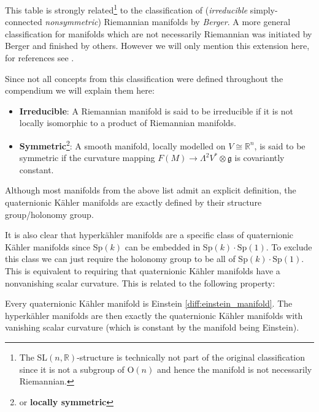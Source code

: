 	\begin{remark*}
		This table is strongly related\footnote{The SL$(n, \mathbb{R})$-structure is technically not part of the original classification since it is not a subgroup of O$(n)$ and hence the manifold is not necessarily Riemannian.} to the classification of (\textit{irreducible} simply-connected \textit{nonsymmetric}) Riemannian manifolds by \textit{Berger}. A more general classification for manifolds which are not necessarily Riemannian was initiated by Berger and finished by others. However we will only mention this extension here, for references see \cite{diffgeom_physics}.
		
		Since not all concepts from this classification were defined throughout the compendium we will explain them here:
		\begin{itemize}
			\item \textbf{Irreducible}: A Riemannian manifold is said to be irreducible if it is not locally isomorphic to a product of Riemannian manifolds.
			\item \textbf{Symmetric}\footnote{or \textbf{locally symmetric}}: A smooth manifold, locally modelled on $V\cong\mathbb{R}^n$, is said to be symmetric if the curvature mapping $F(M)\rightarrow\Lambda^2V^*\otimes\mathfrak{g}$ is covariantly constant.
		\end{itemize}
	\end{remark*}
	
	\begin{remark}
		Although most manifolds from the above list admit an explicit definition, the quaternionic K\"ahler manifolds are exactly defined by their structure group/holonomy group.
		
		It is also clear that hyperk\"ahler manifolds are a specific class of quaternionic K\"ahler manifolds since Sp$(k)$ can be embedded in Sp$(k)\cdot\text{Sp}(1)$. To exclude this class we can just require the holonomy group to be all of Sp$(k)\cdot\text{Sp}(1)$. This is equivalent to requiring that quaternionic K\"ahler manifolds have a nonvanishing scalar curvature. This is related to the following property:
	\end{remark}
	\begin{property}
		Every quaternionic K\"ahler manifold is Einstein \ref{diff:einstein_manifold}. The hyperk\"ahler manifolds are then exactly the quaternionic K\"ahler manifolds with vanishing scalar curvature (which is constant by the manifold being Einstein).  
	\end{property}
